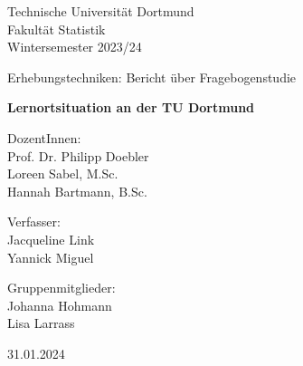\documentclass[11pt, a4paper]{article}
\begin{document}
\thispagestyle{empty}

\begin{center}
	\Large
	Technische Universität Dortmund\\
	Fakultät Statistik\\
	Wintersemester 2023/24\\
	
	\vspace{6em}
	
	Erhebungstechniken: Bericht über Fragebogenstudie
	
	\Huge
	\textbf{Lernortsituation an der TU Dortmund}
	
	\Large
	\vspace{4em}
	DozentInnen:	\\Prof. Dr. Philipp Doebler \\Loreen Sabel, M.Sc.\\Hannah Bartmann, B.Sc.


	\vspace{6em}
	Verfasser: \\
	Jacqueline Link \\ Yannick Miguel
	
	\vspace{6em}
	Gruppenmitglieder:\\
	Johanna Hohmann\\
	Lisa Larrass
	
    \vspace{6em}
    
	31.01.2024
\end{center}

\newpage \null\thispagestyle{empty}\newpage
\tableofcontents
\newpage\null\thispagestyle{empty}\newpage
\end{document}
